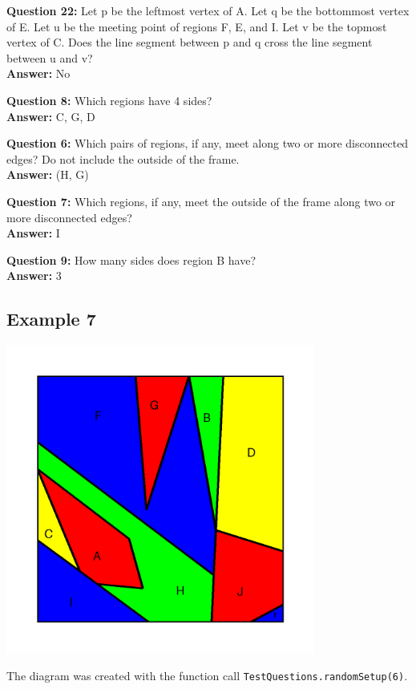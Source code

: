 \documentclass{article}    %
\begin{document}
{\bf Question  22:} Let p be the leftmost vertex of A. Let q be the bottommost vertex of E. Let u be the meeting point of regions F, E, and I. Let v be the topmost vertex of C. Does the line segment between p and q cross the line segment between u and v? \\
{\bf Answer:}  No 

{\bf Question  8:} Which regions have 4 sides? \\
{\bf Answer:}  {C, G, D} 

{\bf Question  6:} Which pairs of regions, if any, meet along two or more disconnected edges? Do not include the outside of the frame. \\
{\bf Answer:}  {(H, G)} 

{\bf Question  7:} Which regions, if any, meet the outside of the frame along two or more disconnected edges? \\
{\bf Answer:}  {I} 

{\bf Question  9:} How many sides does region B have? \\
{\bf Answer:}  3

\pagebreak

\subsection{Example 7}
\begin{center}
\includegraphics[height=4in]{Maps/RandomSetup6.png}
\end{center}

{\small  The diagram was created with the function 
call {\tt TestQuestions.randomSetup(6)}.}
\end{document}
